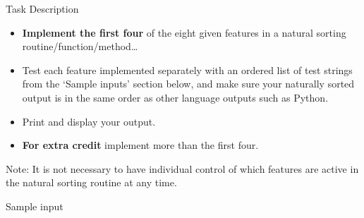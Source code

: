 \pagebreak{}
Task Description

\begin{itemize}
\item
  \textbf{Implement the first four} of the eight given features in a
  natural sorting routine/function/method\ldots{}
\item
  Test each feature implemented separately with an ordered list of test
  strings from the `Sample inputs' section below, and make sure your
  naturally sorted output is in the same order as other language outputs
  such as Python.
\item
  Print and display your output.
\end{itemize}

\begin{itemize}
\item
  \textbf{For extra credit} implement more than the first four.
\end{itemize}

Note: It is not necessary to have individual control of which features
are active in the natural sorting routine at any time.

\begin{description}
\item[Sample input]
\end{description}


